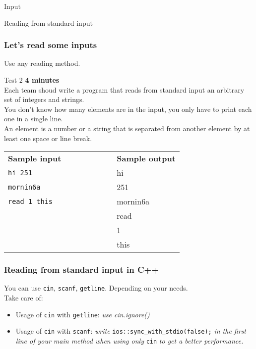 \documentclass{beamer}
\newcommand{\source}[1]{
	
}
\begin{document}
\begin{section}{Input}
\begin{subsection}{Reading from standard input}
\begin{frame}[fragile]
	\frametitle{Let's read some inputs}
	Use any reading method.
	\pause
	\begin{block}{Test 2}
		\textbf{4 minutes}\\
		Each team shoud write a program that reads from standard input an arbitrary set of integers and strings.\\
		You don't know how many elements are in the input, you only have to print each one in a single line.\\
		An element is a number or a string that is separated from another element by at least one space or line break.\\
	\end{block}
	\begin{tabular}{ l c c c c c c l }
		\textbf{Sample input} & & & & & & & \textbf{Sample output} \\
		\texttt{hi 251} & & & & & & & hi \\
		\texttt{mornin6a} & & & & & & & 251 \\
		\texttt{read 1 this} & & & & & & & mornin6a \\
		& & & & & & & read \\
		& & & & & & & 1 \\
		& & & & & & & this \\
	\end{tabular}
\end{frame}

\begin{frame}[fragile]
	\frametitle{Reading from standard input in C++}
	You can use \texttt{cin}, \texttt{scanf}, \texttt{getline}. Depending on your needs.\\
	Take care of:
	\begin{itemize}
		\item Usage of \texttt{cin} with \texttt{getline}: \emph{use cin.ignore()}
		\item Usage of \texttt{cin} with \texttt{scanf}: \emph{write} \texttt{ios::sync\_with\_stdio(false);}
			\emph{in the first line of your main method when using only} \texttt{cin}
			\emph{to get a better performance.}
	\end{itemize}
\end{frame}

\end{subsection}
\end{section}
\end{document}

